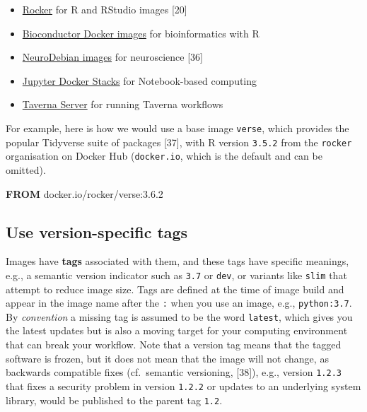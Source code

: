 \documentclass[10pt,letterpaper]{article}
\newenvironment{Shaded}{\begin{snugshade}}{\end{snugshade}}
\newcommand{\KeywordTok}[1]{\textcolor[rgb]{0.13,0.29,0.53}{\textbf{#1}}}
\newcommand{\NormalTok}[1]{#1}
\providecommand{\tightlist}{%
  \setlength{\itemsep}{0pt}\setlength{\parskip}{0pt}}
\begin{document}
\begin{itemize}
\tightlist
\item
  \href{https://www.rocker-project.org/}{Rocker} for R and RStudio
  images {[}20{]}
\item
  \href{https://bioconductor.org/help/docker/}{Bioconductor Docker
  images} for bioinformatics with R
\item
  \href{https://hub.docker.com/_/neurodebian}{NeuroDebian images} for
  neuroscience {[}36{]}
\item
  \href{https://jupyter-docker-stacks.readthedocs.io/en/latest/index.html}{Jupyter
  Docker Stacks} for Notebook-based computing
\item
  \href{https://hub.docker.com/r/taverna/taverna-server}{Taverna Server}
  for running Taverna workflows
\end{itemize}

For example, here is how we would use a base image \texttt{verse}, which
provides the popular Tidyverse suite of packages {[}37{]}, with R
version \texttt{3.5.2} from the \texttt{rocker} organisation on Docker
Hub (\texttt{docker.io}, which is the default and can be omitted).

\footnotesize

\begin{Shaded}
\begin{Highlighting}[]
\KeywordTok{FROM}\NormalTok{ docker.io/rocker/verse:3.6.2}
\end{Highlighting}
\end{Shaded}

\normalsize

\hypertarget{use-version-specific-tags}{%
\subsection{Use version-specific tags}\label{use-version-specific-tags}}

Images have \textbf{tags} associated with them, and these tags have
specific meanings, e.g., a semantic version indicator such as
\texttt{3.7} or \texttt{dev}, or variants like \texttt{slim} that
attempt to reduce image size. Tags are defined at the time of image
build and appear in the image name after the \texttt{:} when you use an
image, e.g., \texttt{python:3.7}. By \emph{convention} a missing tag is
assumed to be the word \texttt{latest}, which gives you the latest
updates but is also a moving target for your computing environment that
can break your workflow. Note that a version tag means that the tagged
software is frozen, but it does not mean that the image will not change,
as backwards compatible fixes (cf.~semantic versioning, {[}38{]}), e.g.,
version \texttt{1.2.3} that fixes a security problem in version
\texttt{1.2.2} or updates to an underlying system library, would be
published to the parent tag \texttt{1.2}.
\end{document}
